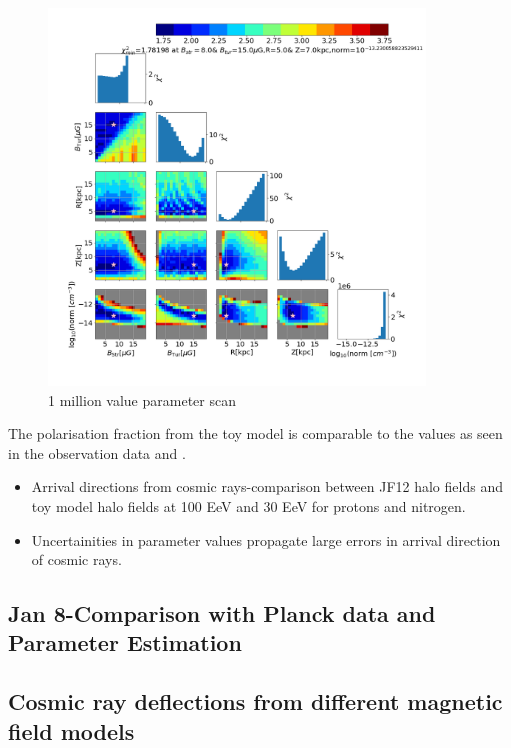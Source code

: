 \documentclass[12pt, a4 paper]{article}
\newcommand{\Vasu}[1]{{\color{purple}#1}}
\begin{document}
\begin{figure}[h!]
        \centering
        \includegraphics[width = 10cm]{Images/Jan8_Chsq_dof_Para_Scan_1_9_3_elec_den_norm_10GeV.png}
        \caption{\Vasu{1 million value parameter scan}}
        \label{fig:my_label}
\end{figure}




The polarisation fraction from the toy model is comparable to the values as seen in the observation data \cite{2013} and \cite{WMAP_Page}.
\begin{itemize}
 
    \item Arrival directions from cosmic rays-comparison between JF12 halo fields and toy model halo fields at 100 EeV and 30 EeV for protons and nitrogen.
    \item Uncertainities in parameter values propagate large errors in arrival direction of cosmic rays.
\end{itemize}
\newpage
\subsection{Jan 8-Comparison with Planck data and Parameter Estimation}





\subsection{Cosmic ray deflections from different magnetic field models}
\end{document}
